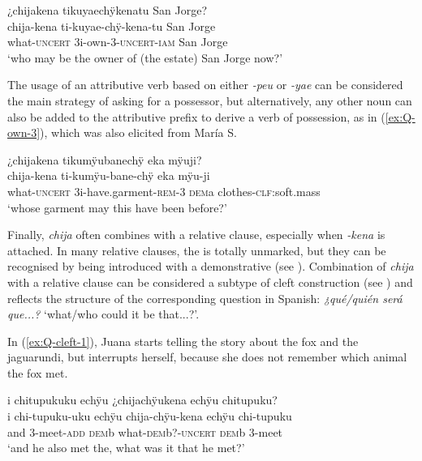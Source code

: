 \ea\label{ex:Q-own-2}
\begingl
\glpreamble ¿chijakena tikuyaechÿkenatu San Jorge?\\
\gla chija-kena ti-kuyae-chÿ-kena-tu {San Jorge}\\
\glb what-\textsc{uncert} 3i-own-3-\textsc{uncert}-\textsc{iam} {San Jorge}\\
\glft ‘who may be the owner of (the estate) San Jorge now?’
\endgl
\trailingcitation{[rxx-e201231f.34]}
\xe

The usage of an attributive verb based on either \textit{-peu} or \textit{-yae} can be considered the main strategy of asking for a possessor, but alternatively, any other noun can also be added to the attributive prefix to derive a verb of possession, as in (\ref{ex:Q-own-3}), which was also elicited from María S.

\ea\label{ex:Q-own-3}
\begingl
\glpreamble ¿chijakena tikumÿubanechÿ eka mÿuji?\\
\gla chija-kena ti-kumÿu-bane-chÿ eka mÿu-ji\\
\glb what-\textsc{uncert} 3i-have.garment-\textsc{rem}-3 \textsc{dem}a clothes-\textsc{clf:}soft.mass\\
\glft ‘whose garment may this have been before?’
\endgl
\trailingcitation{[rxx-e201231f.44]}
\xe
{}

Finally, \textit{chija} often combines with a relative clause, especially when \textit{-kena} is attached. In many relative clauses, the  is totally unmarked, but they can be recognised by being introduced with a demonstrative (see ). Combination of \textit{chija} with a relative clause can be considered a subtype of cleft construction (see ) and reflects the structure of the corresponding question in Spanish: \textit{¿qué/quién será que...?} ‘what/who could it be that...?’.

In (\ref{ex:Q-cleft-1}), Juana starts telling the story about the fox and the jaguarundi, but interrupts herself, because she does not remember which animal the fox met.

\ea\label{ex:Q-cleft-1}
\begingl
\glpreamble i chitupukuku echÿu ¿chijachÿukena echÿu chitupuku?\\
\gla i chi-tupuku-uku echÿu chija-chÿu-kena echÿu chi-tupuku\\
\glb and 3-meet-\textsc{add} \textsc{dem}b what-\textsc{dem}b?-\textsc{uncert} \textsc{dem}b 3-meet\\
\glft ‘and he also met the, what was it that he met?’
\endgl
\trailingcitation{[jmx-n120429ls-x5.301-302]}
\xe

